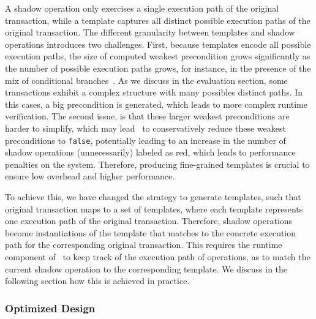 
A shadow operation only exercises a single execution path
of the original transaction, while a template captures all distinct possible execution paths
of the original transaction. The different
granularity between templates and shadow operations introduces two challenges. 
First, because templates encode all possible execution paths, the size of
computed weakest precondition grows significantly as the number of possible 
execution paths grows, for instance, in the presence
of the mix of conditional branches~\cite{Flanagan2001CompactVC}. 
As we discuss in the evaluation section, some transactions exhibit a complex structure
with many possibles distinct paths. In this cases,
a big precondition is generated, which leads to more complex runtime verification. 
The second issue, is that these larger weakest preconditions are harder to simplify, which may lead
\tool\ to conservatively reduce these weakest preconditions to \texttt{false}, potentially leading to an
increase in the number of shadow operations (unnecessarily) labeled as red, which leads to 
performance penalties on the system. Therefore, producing
fine-grained templates is crucial to ensure low overhead and higher performance.

To achieve this, we have changed the strategy to generate templates, such that
original transaction maps to a set of templates, where each template represents one
execution path of the original transaction. Therefore, shadow operations become 
instantiations of the template that matches to the concrete execution path for the corresponding
original transaction. This requires the runtime component of \tool\ to keep track of the execution
path of operations, as to match the current shadow operation to the corresponding template.
We discuss in the following section how this is achieved in practice.


\subsubsection{Optimized Design}

\fi



